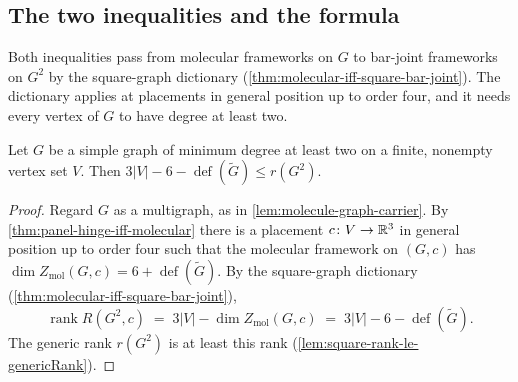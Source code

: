 \subsection{The two inequalities and the formula}
\label{sec:molecule-application-formula}

Both inequalities pass from molecular frameworks on $G$ to bar-joint
frameworks on $G^2$ by the square-graph dictionary
(\cref{thm:molecular-iff-square-bar-joint}). The dictionary applies at
placements in general position up to order four, and it needs every
vertex of $G$ to have degree at least two.

\begin{lemma}
  \label{lem:molecule-rank-lower-bound}
  \leanok
  Let $G$ be a simple graph of minimum degree at least two on a finite,
  nonempty vertex set $V$. Then
  $3|V| - 6 - \operatorname{def}(\tilde G) \le r(G^2)$.
\end{lemma}
\begin{proof}
  \leanok
  Regard $G$ as a multigraph, as in \cref{lem:molecule-graph-carrier}. By
  \cref{thm:panel-hinge-iff-molecular} there is a placement
  $c \colon V \to {\mathbb{R}}^3$ in general position up to order four such that
  the molecular framework on $(G, c)$ has
  $\dim Z_{\mathrm{mol}}(G, c) = 6 + \operatorname{def}(\tilde G)$. By the
  square-graph dictionary (\cref{thm:molecular-iff-square-bar-joint}),
  \[
    \operatorname{rank} R(G^2, c) \;=\; 3|V| - \dim Z_{\mathrm{mol}}(G, c)
    \;=\; 3|V| - 6 - \operatorname{def}(\tilde G).
  \]
  The generic rank $r(G^2)$ is at least this rank
  (\cref{lem:square-rank-le-genericRank}).
\end{proof}


